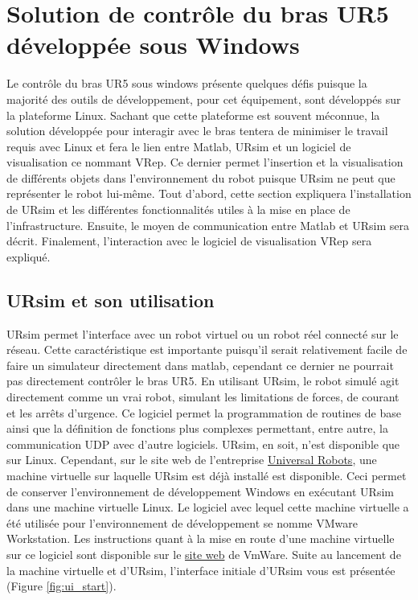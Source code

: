 \documentclass[root.tex]{subfiles}
\begin{document}
\section{Solution de contrôle du bras UR5 développée sous Windows}

Le contrôle du bras UR5 sous windows présente quelques défis puisque la majorité des outils de développement, pour cet équipement, sont développés sur la plateforme Linux.
Sachant que cette plateforme est souvent méconnue, la solution développée pour interagir avec le bras tentera de minimiser le travail requis avec Linux et fera le lien entre Matlab, URsim et un logiciel de visualisation ce nommant VRep. 
Ce dernier permet l'insertion et la visualisation de différents objets dans l'environnement du robot puisque URsim ne peut que représenter le robot lui-même.
Tout d'abord, cette section expliquera l'installation de URsim et les différentes fonctionnalités utiles à la mise en place de l'infrastructure.
Ensuite, le moyen de communication entre Matlab et URsim sera décrit.
Finalement, l'interaction avec le logiciel de visualisation VRep sera expliqué.

\subsection{URsim et son utilisation}

URsim permet l'interface avec un robot virtuel ou un robot réel connecté sur le réseau.
Cette caractéristique est importante puisqu'il serait relativement facile de faire un simulateur directement dans matlab, cependant ce dernier ne pourrait pas directement contrôler le bras UR5.
En utilisant URsim, le robot simulé agit directement comme un vrai robot, simulant les limitations de forces, de courant et les arrêts d'urgence.
Ce logiciel permet la programmation de routines de base ainsi que la définition de fonctions plus complexes permettant, entre autre, la communication UDP avec d'autre logiciels.
URsim, en soit, n'est disponible que sur Linux.
Cependant, sur le site web de l'entreprise \href{https://www.universal-robots.com/download/}{Universal Robots}, une machine virtuelle sur laquelle URsim est déjà installé est disponible.
Ceci permet de conserver l'environnement de développement Windows en exécutant URsim dans une machine virtuelle Linux.
Le logiciel avec lequel cette machine virtuelle a été utilisée pour l'environnement de développement se nomme VMware Workstation.
Les instructions quant à la mise en route d'une machine virtuelle sur ce logiciel sont disponible sur le \href{https://my.vmware.com/en/web/vmware/free#desktop_end_user_computing/vmware_workstation_player/14_0}{site web} de VmWare.
Suite au lancement de la machine virtuelle et d'URsim, l'interface initiale d'URsim vous est présentée (Figure \ref{fig:ui_start}).
\end{document}
